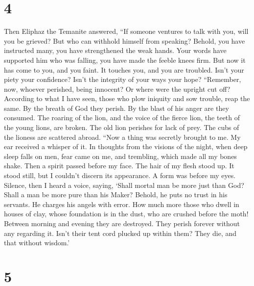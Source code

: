 \hypertarget{section-3}{%
\section{4}\label{section-3}}

 Then Eliphaz the Temanite answered,  ``If
someone ventures to talk with you, will you be grieved? But who can
withhold himself from speaking?  Behold, you have
instructed many, you have strengthened the weak hands. 
Your words have supported him who was falling, you have made the feeble
knees firm.  But now it has come to you, and you faint. It
touches you, and you are troubled.  Isn't your piety your
confidence? Isn't the integrity of your ways your hope? 
``Remember, now, whoever perished, being innocent? Or where were the
upright cut off?  According to what I have seen, those who
plow iniquity and sow trouble, reap the same.  By the
breath of God they perish. By the blast of his anger are they consumed.
 The roaring of the lion, and the voice of the fierce
lion, the teeth of the young lions, are broken.  The old
lion perishes for lack of prey. The cubs of the lioness are scattered
abroad.  ``Now a thing was secretly brought to me. My ear
received a whisper of it.  In thoughts from the visions
of the night, when deep sleep falls on men,  fear came on
me, and trembling, which made all my bones shake.  Then a
spirit passed before my face. The hair of my flesh stood up.
 It stood still, but I couldn't discern its appearance. A
form was before my eyes. Silence, then I heard a voice, saying,
 `Shall mortal man be more just than God? Shall a man be
more pure than his Maker?  Behold, he puts no trust in
his servants. He charges his angels with error.  How much
more those who dwell in houses of clay, whose foundation is in the dust,
who are crushed before the moth!  Between morning and
evening they are destroyed. They perish forever without any regarding
it.  Isn't their tent cord plucked up within them? They
die, and that without wisdom.'

\hypertarget{section-4}{%
\section{5}\label{section-4}}

